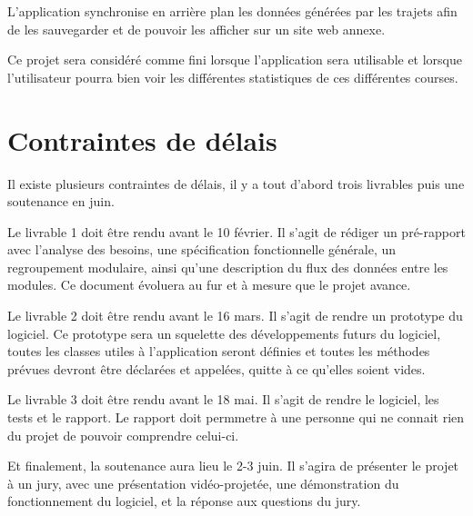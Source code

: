 L'application synchronise en arrière plan les données générées par les trajets afin de les sauvegarder et de pouvoir les afficher sur un site web annexe.

Ce projet sera considéré comme fini lorsque l’application sera utilisable et lorsque l’utilisateur pourra bien voir les différentes statistiques de ces différentes courses.

\section{Contraintes de délais}

Il existe plusieurs contraintes de délais, il y a tout d'abord trois livrables puis une soutenance en juin.

Le livrable 1 doit être rendu avant le 10 février. Il s'agit de rédiger un pré-rapport avec l'analyse des besoins, une spécification fonctionnelle générale, un regroupement modulaire, ainsi qu'une description du flux des données entre les modules. Ce document évoluera au fur et à mesure que le projet avance.

Le livrable 2 doit être rendu avant le 16 mars. Il s'agit de rendre un prototype du logiciel. Ce prototype sera un squelette des développements futurs du logiciel, toutes les classes utiles à l'application seront définies et toutes les méthodes prévues devront être déclarées et appelées, quitte à ce qu'elles soient vides.

Le livrable 3 doit être rendu avant le 18 mai. Il s'agit de rendre le logiciel, les tests et le rapport. Le rapport doit permmetre à une personne qui ne connait rien du projet de pouvoir comprendre celui-ci.

Et finalement, la soutenance aura lieu le 2-3 juin. Il s'agira de présenter le projet à un jury, avec une présentation vidéo-projetée, une démonstration du fonctionnement du logiciel, et la réponse aux questions du jury.
